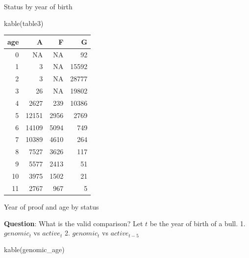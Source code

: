 \documentclass[
]{article}
\newenvironment{Shaded}{\begin{snugshade}}{\end{snugshade}}
\newcommand{\FunctionTok}[1]{\textcolor[rgb]{0.00,0.00,0.00}{#1}}
\newcommand{\NormalTok}[1]{#1}
\begin{document}
Status by year of birth

\begin{Shaded}
\begin{Highlighting}[]
\FunctionTok{kable}\NormalTok{(table3)}
\end{Highlighting}
\end{Shaded}

\begin{longtable}[]{@{}rrrr@{}}
\toprule()
age & A & F & G \\
\midrule()
\endhead
0 & NA & NA & 92 \\
1 & 3 & NA & 15592 \\
2 & 3 & NA & 28777 \\
3 & 26 & NA & 19802 \\
4 & 2627 & 239 & 10386 \\
5 & 12151 & 2956 & 2769 \\
6 & 14109 & 5094 & 749 \\
7 & 10389 & 4610 & 264 \\
8 & 7527 & 3626 & 117 \\
9 & 5577 & 2413 & 51 \\
10 & 3975 & 1502 & 21 \\
11 & 2767 & 967 & 5 \\
\bottomrule()
\end{longtable}

Year of proof and age by status

\textbf{Question}: What is the valid comparison? Let \(t\) be the year
of birth of a bull. 1. \(genomic_{t}\) vs \(active_{t}\) 2.
\(genomic_{t}\) vs \(active_{t-5}\)

\begin{Shaded}
\begin{Highlighting}[]
\FunctionTok{kable}\NormalTok{(genomic\_age)}
\end{Highlighting}
\end{Shaded}
\end{document}
